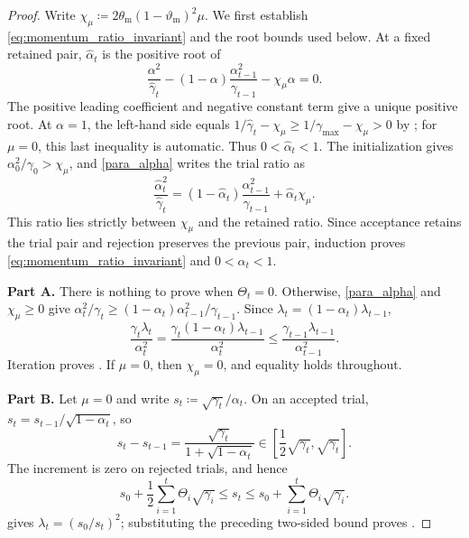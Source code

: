 \documentclass{article}
\begin{document}
\begin{lemma}
\end{lemma}
\begin{proof}
\label{proof:momentum_bounds}
Write \(\chi_\mu\coloneqq 2\theta_{\mathrm{m}}(1-\vartheta_{\mathrm{m}})^2\mu\).
We first establish \eqref{eq:momentum_ratio_invariant} and the root
bounds used below. At a fixed retained pair, \(\hat\alpha_t\) is the
positive root of
\[
\frac{\alpha^2}{\hat\gamma_t}
-(1-\alpha)\frac{\alpha_{t-1}^2}{\gamma_{t-1}}
-\chi_\mu\alpha=0.
\]
The positive leading coefficient and negative constant term give a
unique positive root. At \(\alpha=1\), the left-hand side equals
\(1/\hat\gamma_t-\chi_\mu\ge1/\gamma_{\max}-\chi_\mu>0\)
by ; for \(\mu=0\), this last inequality is automatic.
Thus \(0<\hat\alpha_t<1\). The initialization gives
\(\alpha_0^2/\gamma_0>\chi_\mu\), and \eqref{para_alpha} writes
the trial ratio as
\[
\frac{\hat\alpha_t^2}{\hat\gamma_t}
=(1-\hat\alpha_t)\frac{\alpha_{t-1}^2}{\gamma_{t-1}}
+\hat\alpha_t\chi_\mu.
\]
This ratio lies strictly between \(\chi_\mu\) and the retained ratio.
Since acceptance retains the trial pair and rejection preserves the
previous pair, induction proves \eqref{eq:momentum_ratio_invariant}
and \(0<\alpha_t<1\).

\medskip
\noindent\textbf{Part A.}
There is nothing to prove when \(\Theta_t=0\). Otherwise,
\eqref{para_alpha} and \(\chi_\mu\ge0\) give
\(\alpha_t^2/\gamma_t\ge
(1-\alpha_t)\alpha_{t-1}^2/\gamma_{t-1}\). Since
\(\lambda_t=(1-\alpha_t)\lambda_{t-1}\),
\[
\frac{\gamma_t\lambda_t}{\alpha_t^2}
=
\frac{\gamma_t(1-\alpha_t)\lambda_{t-1}}{\alpha_t^2}
\le
\frac{\gamma_{t-1}\lambda_{t-1}}{\alpha_{t-1}^2}.
\]
Iteration proves . If \(\mu=0\), then
\(\chi_\mu=0\), and equality holds throughout.

\medskip
\noindent\textbf{Part B.}
Let \(\mu=0\) and write \(s_t\coloneqq \sqrt{\gamma_t}/\alpha_t\). On an
accepted trial, \(s_t=s_{t-1}/\sqrt{1-\alpha_t}\), so
\[
s_t-s_{t-1}
=\frac{\sqrt{\gamma_t}}{1+\sqrt{1-\alpha_t}}
\in\left[\frac12\sqrt{\gamma_t},\sqrt{\gamma_t}\right].
\]
The increment is zero on rejected trials, and hence
\[
s_0+\frac12\sum_{i=1}^t\Theta_i\sqrt{\gamma_i}
\le
s_t
\le
s_0+\sum_{i=1}^t\Theta_i\sqrt{\gamma_i}.
\]
 gives
\(\lambda_t=(s_0/s_t)^2\); substituting the preceding two-sided bound
proves .


\end{proof}
\end{document}
